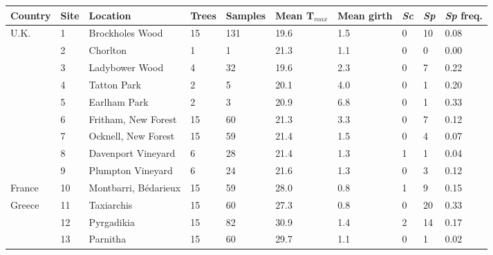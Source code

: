 \begin{tabular}{lllllp{1cm}p{1cm}llp{1cm}} \hline
Country & Site & Location & Trees\footnote & Samples & Mean T$_{max}$\footnote & Mean girth\footnote & \textit{Sc} & \textit{Sp} & \textit{Sp} freq.\footnote\ \\ \hline
U.K. & 1 & Brockholes Wood & 15 & 131 & 19.6 & 1.5 & 0 & 10 & 0.08 \\ 
 & 2 & Chorlton & 1 & 1 & 21.3 & 1.1 & 0 & 0 & 0.00 \\ 
 & 3 & Ladybower Wood & 4 & 32 & 19.6 & 2.3 & 0 & 7 & 0.22 \\ 
 & 4 & Tatton Park & 2 & 5 & 20.1 & 4.0 & 0 & 1 & 0.20 \\ 
 & 5 & Earlham Park & 2 & 3 & 20.9 & 6.8 & 0 & 1 & 0.33 \\ 
 & 6 & Fritham, New Forest & 15 & 60 & 21.3 & 3.3 & 0 & 7 & 0.12 \\ 
 & 7 & Ocknell, New Forest & 15 & 59 & 21.4 & 1.5 & 0 & 4 & 0.07 \\ 
 & 8 & Davenport Vineyard & 6 & 28 & 21.4 & 1.3 & 1 & 1 & 0.04 \\ 
 & 9 & Plumpton Vineyard & 6 & 24 & 21.6 & 1.3 & 0 & 3 & 0.12 \\ 
France & 10 & Montbarri, B\'{e}darieux & 15 & 59 & 28.0 & 0.8 & 1 & 9 & 0.15 \\ 
Greece & 11 & Taxiarchis & 15 & 60 & 27.3 & 0.8 & 0 & 20 & 0.33 \\ 
 & 12 & Pyrgadikia & 15 & 82 & 30.9 & 1.4 & 2 & 14 & 0.17 \\ 
 & 13 & Parnitha & 15 & 60 & 29.7 & 1.1 & 0 & 1 & 0.02 \\ 
\hline
\end{tabular}
